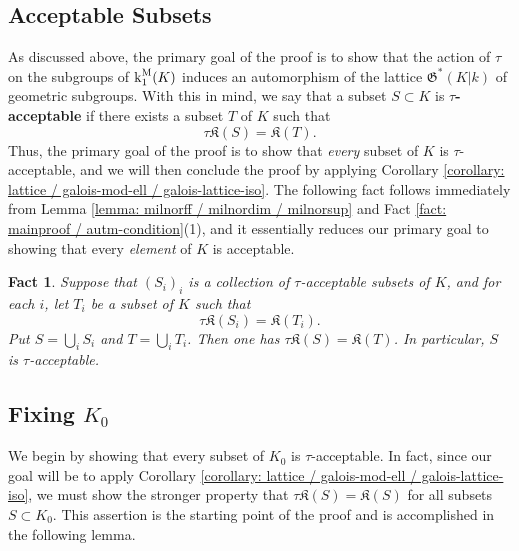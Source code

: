 \documentclass[11pt]{amsart}
\newtheorem{fact}[proposition]{Fact}
\theoremstyle{definition}
\theoremstyle{remark}
\numberwithin{equation}{section}
\newcommand{\Kfrak}{\mathfrak{K}}
\newcommand{\Gfrak}{\mathfrak{G}}
\renewcommand{\k}{\operatorname{k}^{\rm M}}
\begin{document}
\subsection{Acceptable Subsets}
\label{subsection: mainproof / acceptable}

As discussed above, the primary goal of the proof is to show that the action of $\tau$ on the subgroups of $\k_1(K)$ induces an automorphism of the lattice $\Gfrak^*(K|k)$ of geometric subgroups.
With this in mind, we say that a subset $S \subset K$ is {\bf $\tau$-acceptable} if there exists a subset $T$ of $K$ such that
\[ \tau\Kfrak(S) = \Kfrak(T). \]
Thus, the primary goal of the proof is to show that \emph{every} subset of $K$ is $\tau$-acceptable, and we will then conclude the proof by applying Corollary \ref{corollary: lattice / galois-mod-ell / galois-lattice-iso}.
The following fact follows immediately from Lemma \ref{lemma: milnorff / milnordim / milnorsup} and Fact \ref{fact: mainproof / autm-condition}(1), and it essentially reduces our primary goal to showing that every \emph{element} of $K$ is acceptable.

\begin{fact}
\label{fact: mainproof / acceptable / acceptable}
  Suppose that $(S_i)_i$ is a collection of $\tau$-acceptable subsets of $K$, and for each $i$, let $T_i$ be a subset of $K$ such that
  \[ \tau \Kfrak(S_i) = \Kfrak(T_i). \]
  Put $S = \bigcup_i S_i$ and $T = \bigcup_i T_i$.
  Then one has $\tau\Kfrak(S) = \Kfrak(T)$.
  In particular, $S$ is $\tau$-acceptable.
\end{fact}

\subsection{Fixing $K_0$}
\label{susbection: mainproof / K0}

We begin by showing that every subset of $K_0$ is $\tau$-acceptable.
In fact, since our goal will be to apply Corollary \ref{corollary: lattice / galois-mod-ell / galois-lattice-iso}, we must show the stronger property that $\tau \Kfrak(S) = \Kfrak(S)$ for all subsets $S \subset K_0$.
This assertion is the starting point of the proof and is accomplished in the following lemma.
\end{document}
